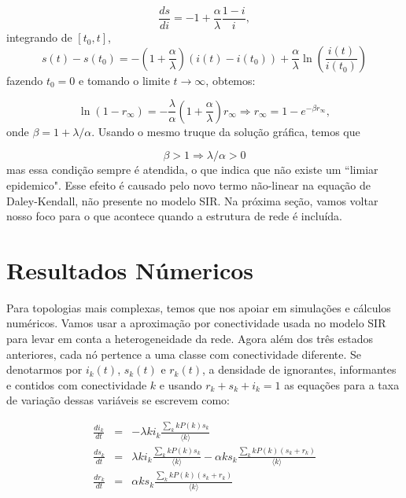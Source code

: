 \documentclass[a4paper,11pt]{report}
\begin{document}
\begin{equation}
\frac{ds}{di}=-1+\frac{\alpha}{\lambda}\frac{1-i}{i},
\end{equation}
integrando de $[t_0, t]$, 
\begin{equation}
s(t)-s(t_0)=-\left(1+\frac{\alpha}{\lambda}\right)(i(t)-i(t_0))+\frac{\alpha}{\lambda}\ln\left(\frac{i(t)}{i(t_0)}\right)
\end{equation}
fazendo $t_0= 0$ e tomando o limite $t\to\infty$, obtemos:

\begin{equation}
\ln(1-r_{\infty})=-\frac{\lambda}{\alpha}\left(1+\frac{\alpha}{\lambda}\right)r_{\infty}\Rightarrow r_{\infty}=1-e^{-\beta r_{\infty}},
\label{eq:rinf-DK-CM}
\end{equation}
onde $\beta=1+\lambda/\alpha$. Usando o mesmo truque da solu\c{c}\~ao gr\'afica, temos que 

\begin{equation}
\beta>1\Rightarrow \lambda/\alpha>0
\end{equation}
mas essa condi\c{c}\~ao sempre \'e atendida, o que indica que n\~ao existe um ``limiar epidemico". Esse efeito \'e causado pelo novo termo n\~ao-linear na equa\c{c}\~ao de Daley-Kendall, n\~ao presente no modelo SIR. Na pr\'oxima se\c{c}\~ao, vamos voltar nosso foco para o que acontece quando a estrutura de rede \'e inclu\'ida. 

\section{Resultados N\'umericos}

Para topologias mais complexas, temos que nos apoiar em simula\c{c}\~oes e c\'alculos num\'ericos. Vamos usar a aproxima\c{c}\~ao por conectividade usada no modelo SIR para levar em conta a heterogeneidade da rede. Agora al\'em dos tr\^es estados anteriores, cada n\'o pertence a uma classe com conectividade diferente. Se denotarmos por $i_k(t)$, $s_k(t)$ e $r_k(t)$, a densidade de ignorantes, informantes e contidos com conectividade $k$ e usando $r_k+s_k+i_k=1$ as equa\c{c}\~oes para a taxa de varia\c{c}\~ao dessas vari\'aveis se escrevem como:

\begin{eqnarray}
\frac{di_k}{dt}&=& - \lambda k i_k \frac{\sum_k k P(k) s_k}{\langle k \rangle}\label{eq:degree-dk-inf}\\
\frac{ds_k}{dt}&=& \lambda k i_k \frac{\sum_k k P(k) s_k}{\langle k \rangle}-\alpha k s_k\frac{\sum_k k P(k) (s_k+r_k)}{\langle k \rangle}\label{eq:degree-dk-suc} \\
\frac{dr_k}{dt}&=&\alpha k s_k\frac{\sum_k k P(k) (s_k+r_k)}{\langle k \rangle}\label{eq:degree-dk-rem} 
\end{eqnarray}
\end{document}
